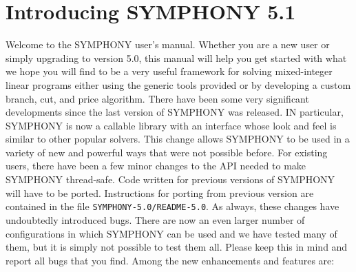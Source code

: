
\section{Introducing SYMPHONY 5.1}
\label{whats-new}

Welcome to the SYMPHONY user's manual. Whether you are a new user or simply
upgrading to version 5.0, this manual will help you get started with what we
hope you will find to be a very useful framework for solving mixed-integer
linear programs either using the generic tools provided or by developing a
custom branch, cut, and price algorithm. There have been some very significant
developments since the last version of SYMPHONY was released. IN particular,
SYMPHONY is now a callable library with an interface whose look and feel is
similar to other popular solvers. This change allows SYMPHONY to be used in a
variety of new and powerful ways that were not possible before. For existing
users, there have been a few minor changes to the API needed to make SYMPHONY
thread-safe. Code written for previous versions of SYMPHONY will have to be
ported. Instructions for porting from previous version are contained in the
file \texttt{SYMPHONY-5.0/README-5.0}. As always, these changes have
undoubtedly introduced bugs. There are now an even larger number of
configurations in which SYMPHONY can be used and we have tested many of them,
but it is simply not possible to test them all. Please keep this in mind and
report all bugs that you find. Among the new enhancements and features are:

